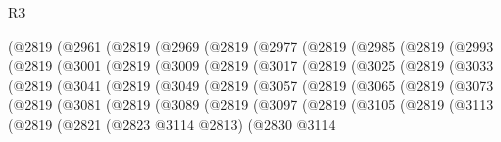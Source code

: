 \begin{lexlean}{R3}
\begin{coremodule}
    (@2819
      (@2961
        (@2819
          (@2969
            (@2819
              (@2977
                (@2819
                  (@2985
                    (@2819
                      (@2993
                        (@2819
                          (@3001
                            (@2819
                              (@3009
                                (@2819
                                  (@3017
                                    (@2819
                                      (@3025
                                        (@2819
                                          (@3033
                                            (@2819
                                              (@3041
                                                (@2819
                                                  (@3049
                                                    (@2819
                                                      (@3057
                                                        (@2819
                                                          (@3065
                                                            (@2819
                                                              (@3073
                                                                (@2819
                                                                  (@3081
                                                                    (@2819
                                                                      (@3089
                                                                        (@2819
                                                                          (@3097
                                                                            (@2819
                                                                              (@3105
                                                                                (@2819
                                                                                  (@3113
                                                                                    (@2819
                                                                                      (@2821
                                                                                        (@2823
                                                                                          @3114
                                                                                          @2813)
                                                                                        (@2830
                                                                                          @3114

\end{coremodule}
\end{lexlean}
